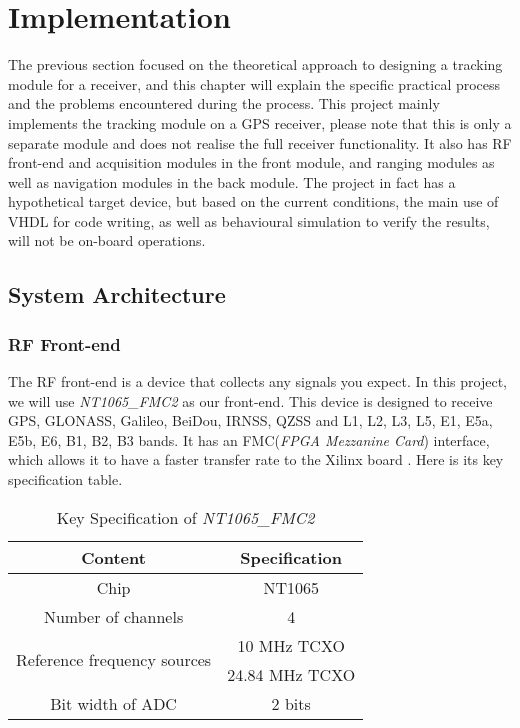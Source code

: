 \myClearDoublePage
\chapter{Implementation}

The previous section focused on the theoretical approach to designing a tracking module for a receiver, and this chapter will explain the specific practical process and the problems encountered during the process. This project mainly implements the tracking module on a GPS receiver, please note that this is only a separate module and does not realise the full receiver functionality. It also has RF front-end and acquisition modules in the front module, and ranging modules as well as navigation modules in the back module. The project in fact has a hypothetical target device, but based on the current conditions, the main use of VHDL for code writing, as well as behavioural simulation to verify the results, will not be on-board operations.

\section{System Architecture}
\subsection{RF Front-end}

The RF front-end is a device that collects any signals you expect. In this project, we will use \textit{NT1065\_FMC2} as our front-end. This device is designed to receive GPS, GLONASS, Galileo, BeiDou, IRNSS, QZSS and L1, L2, L3, L5, E1, E5a, E5b, E6, B1, B2, B3 bands. It has an FMC(\textit{FPGA Mezzanine Card}) interface, which allows it to have a faster transfer rate to the Xilinx board \cite{RN206}. Here is its key specification table.

\begin{table}[!htbp]
\centering
\caption{Key Specification of \textit{NT1065\_FMC2}}\label{tab:nt1065}
\renewcommand\arraystretch{1.5}
\begin{tabular}{cc}
    \toprule
    Content & Specification \\
    \midrule
    Chip & NT1065 \\
    Number of channels & 4 \\
    \multirow{2}{*}{Reference frequency sources} & 10 MHz TCXO \\
     & 24.84 MHz TCXO \\
    Bit width of ADC & 2 bits \\
    \bottomrule
\end{tabular}
\end{table}


